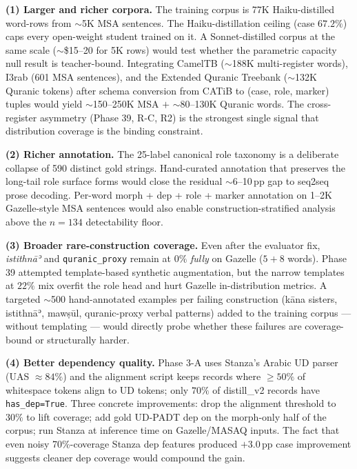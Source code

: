\documentclass[10pt,a4paper,twocolumn]{article}
\begin{document}
\textbf{(1) Larger and richer corpora.} The training corpus is 77K Haiku-distilled word-rows from $\sim$5K MSA sentences. The Haiku-distillation ceiling (case $67.2\%$) caps every open-weight student trained on it. A Sonnet-distilled corpus at the same scale ($\sim$\$15--20 for 5K rows) would test whether the parametric capacity null result is teacher-bound. Integrating CamelTB ($\sim$188K multi-register words), I3rab (601 MSA sentences), and the Extended Quranic Treebank ($\sim$132K Quranic tokens) after schema conversion from CATiB to (case, role, marker) tuples would yield $\sim$150--250K MSA $+$ $\sim$80--130K Quranic words. The cross-register asymmetry (Phase 39, R-C, R2) is the strongest single signal that distribution coverage is the binding constraint.

\textbf{(2) Richer annotation.} The 25-label canonical role taxonomy is a deliberate collapse of 590 distinct gold strings. Hand-curated annotation that preserves the long-tail role surface forms would close the residual $\sim$6--10\,pp gap to seq2seq prose decoding. Per-word morph + dep + role + marker annotation on 1--2K Gazelle-style MSA sentences would also enable construction-stratified analysis above the $n{=}134$ detectability floor.

\textbf{(3) Broader rare-construction coverage.} Even after the evaluator fix, \emph{istithnāʾ} and \texttt{quranic\_proxy} remain at $0\%$ \emph{fully} on Gazelle ($5+8$ words). Phase 39 attempted template-based synthetic augmentation, but the narrow templates at $22\%$ mix overfit the role head and hurt Gazelle in-distribution metrics. A targeted $\sim$500 hand-annotated examples per failing construction (kāna sisters, istithnāʾ, mawṣūl, quranic-proxy verbal patterns) added to the training corpus --- without templating --- would directly probe whether these failures are coverage-bound or structurally harder.

\textbf{(4) Better dependency quality.} Phase 3-A uses Stanza's Arabic UD parser (UAS $\approx 84\%$) and the alignment script keeps records where $\geq 50\%$ of whitespace tokens align to UD tokens; only $70\%$ of distill\_v2 records have \texttt{has\_dep=True}. Three concrete improvements: drop the alignment threshold to $30\%$ to lift coverage; add gold UD-PADT dep on the morph-only half of the corpus; run Stanza at inference time on Gazelle/MASAQ inputs. The fact that even noisy 70\%-coverage Stanza dep features produced $+3.0$\,pp case improvement suggests cleaner dep coverage would compound the gain.
\end{document}
